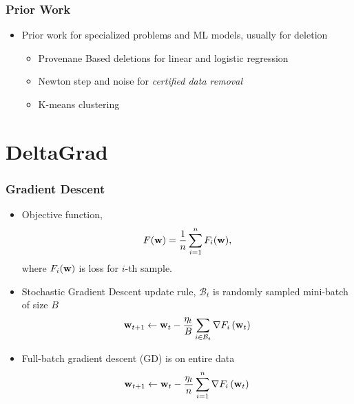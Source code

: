 \documentclass[pdf]{beamer}
\begin{document}
\begin{frame}
  \frametitle{Prior Work}
  \begin{itemize}
    \item Prior work for specialized problems and ML models, usually for deletion
    \begin{itemize}
      \item Provenane Based deletions for linear and logistic regression \cite{wuPrIUProvenanceBasedApproach2020}
      \item Newton step and noise for \textit{certified data removal} \cite{guoCertifiedDataRemoval2020}
      \item K-means clustering \cite{ginartMakingAIForget2019}
    \end{itemize}
  \end{itemize}
\end{frame}

\section{DeltaGrad}
\begin{frame}
  \frametitle{Gradient Descent}
  \begin{itemize}
    \item<1-> Objective function, 
    \[
        F(\textbf{w}) = \frac{1}{n}\sum_{i=1}^{n}F_{i}(\textbf{w}),
    \]
    where $F_{i}(\textbf{w})$ is loss for $i$-th sample.
    \item<2-> Stochastic Gradient Descent update rule, $\mathcal{B}_{t}$ is randomly sampled mini-batch of size $B$
    \[
      \textbf{w}_{t+1} \leftarrow \textbf{w}_{t}-\frac{\eta_{t}}{B} \sum_{i \in \mathcal{B}_{t}} \nabla F_{i}\left(\textbf{w}_{t}\right) 
    \]
    \item<3-> Full-batch gradient descent (GD) is on entire data 
    \[
      \textbf{w}_{t+1} \leftarrow \textbf{w}_{t}-\frac{\eta_{t}}{n} \sum_{i=1}^{n} \nabla F_{i}\left(\textbf{w}_{t}\right) 
    \]
  \end{itemize} 
\end{frame}
\end{document}
